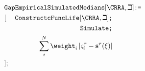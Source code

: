     \begin{eqnarray}
      \lefteqn{    \texttt{GapEmpiricalSimulatedMedians$[\CRRA,\beth]$:=}} & &  \nonumber \\
                                                                           &[&\texttt{ConstructcFuncLife$[\CRRA,\beth]$;}\nonumber\\
                                                                           &&\texttt{Simulate;}\nonumber\\
                                                                           &&\sum\limits_{i}^{N}\weight _{i}\left|\varsigma_{i}^{\tau }-\mathbf{s}^{\tau}(\xi )\right| \nonumber\\
                                                                           &];&\nonumber
    \end{eqnarray}
  
